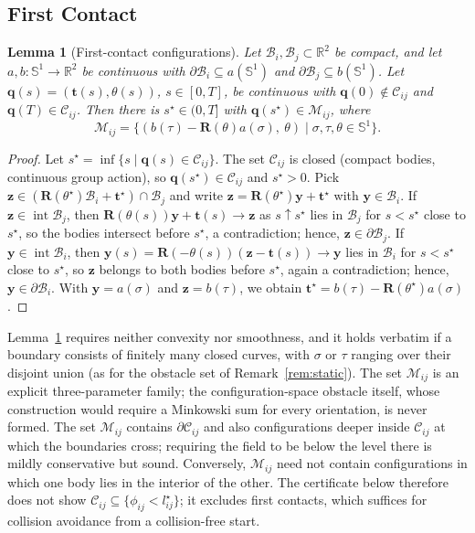 \documentclass[journal]{IEEEtran}
\newtheorem{lemma}{Lemma}
\theoremstyle{definition}
\newcommand{\R}{\mathbb{R}}
\newcommand{\Sone}{\mathbb{S}^1}
\newcommand{\CO}{\mathcal{C}}
\newcommand{\Mset}{\mathcal{M}}
\newcommand{\Rot}{\mathbf{R}}
\begin{document}
\subsection{First Contact}
\begin{lemma}[First-contact configurations]\label{lem:contact}
Let $\mathcal B_i,\mathcal B_j\subset\R^2$ be compact, and let $a,b:\Sone\to\R^2$ be continuous with
$\partial\mathcal B_i\subseteq a(\Sone)$ and $\partial\mathcal B_j\subseteq b(\Sone)$. Let
$\mathbf q(s)=(\mathbf t(s),\theta(s))$, $s\in[0,T]$, be continuous with
$\mathbf q(0)\notin\CO_{ij}$ and $\mathbf q(T)\in\CO_{ij}$. Then there is $s^\star\in(0,T]$ with
$\mathbf q(s^\star)\in\Mset_{ij}$, where
\begin{equation}\label{eq:M}
\Mset_{ij}=\{(b(\tau)-\Rot(\theta)a(\sigma),\ \theta)\mid \sigma,\tau,\theta\in\Sone\}.
\end{equation}
\end{lemma}
\begin{proof}
Let $s^\star=\inf\{s\mid\mathbf q(s)\in\CO_{ij}\}$. The set $\CO_{ij}$ is closed (compact bodies,
continuous group action), so $\mathbf q(s^\star)\in\CO_{ij}$ and $s^\star>0$. Pick
$\mathbf z\in(\Rot(\theta^\star)\mathcal B_i+\mathbf t^\star)\cap\mathcal B_j$ and write
$\mathbf z=\Rot(\theta^\star)\mathbf y+\mathbf t^\star$ with $\mathbf y\in\mathcal B_i$. If
$\mathbf z\in\operatorname{int}\mathcal B_j$, then $\Rot(\theta(s))\mathbf y+\mathbf t(s)\to\mathbf z$
as $s\uparrow s^\star$ lies in $\mathcal B_j$ for $s<s^\star$ close to $s^\star$, so the bodies
intersect before $s^\star$, a contradiction; hence, $\mathbf z\in\partial\mathcal B_j$. If
$\mathbf y\in\operatorname{int}\mathcal B_i$, then
$\mathbf y(s)=\Rot(-\theta(s))(\mathbf z-\mathbf t(s))\to\mathbf y$ lies in $\mathcal B_i$ for
$s<s^\star$ close to $s^\star$, so $\mathbf z$ belongs to both bodies before $s^\star$, again a
contradiction; hence, $\mathbf y\in\partial\mathcal B_i$. With $\mathbf y=a(\sigma)$ and
$\mathbf z=b(\tau)$, we obtain $\mathbf t^\star=b(\tau)-\Rot(\theta^\star)a(\sigma)$.
\end{proof}

Lemma~\ref{lem:contact} requires neither convexity nor smoothness, and it holds verbatim if a
boundary consists of finitely many closed curves, with $\sigma$ or $\tau$ ranging over their
disjoint union (as for the obstacle set of Remark~\ref{rem:static}). The set $\Mset_{ij}$ is an
explicit three-parameter family; the configuration-space obstacle itself, whose construction would
require a Minkowski sum for every orientation, is never formed. The set $\Mset_{ij}$ contains
$\partial\CO_{ij}$ and also configurations deeper inside $\CO_{ij}$ at which the boundaries cross;
requiring the field to be below the level there is mildly conservative but sound. Conversely,
$\Mset_{ij}$ need not contain configurations in which one body lies in the interior of the other.
The certificate below therefore does not show $\CO_{ij}\subseteq\{\phi_{ij}<l^\star_{ij}\}$; it
excludes first contacts, which suffices for collision avoidance from a collision-free start.
\end{document}
